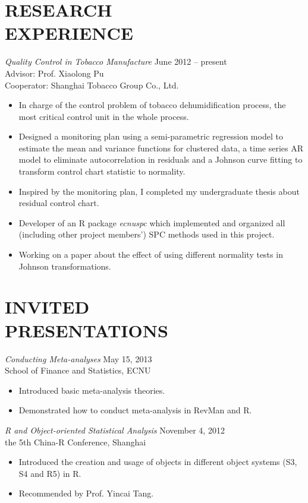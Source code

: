 \documentclass[margin]{res}
\begin{document}
\begin{resume}
		
		\section{RESEARCH \\EXPERIENCE} {\sl Quality Control in Tobacco Manufacture} \hfill June 2012 – present \\
		Advisor: Prof. Xiaolong Pu \\
		Cooperator: Shanghai Tobacco Group Co., Ltd.
		\begin{itemize}  \itemsep -2pt %
			\item In charge of the control problem of tobacco dehumidification process, the most critical control unit in the whole process. 
			\item Designed a monitoring plan using a semi-parametric regression model to estimate the mean and variance functions for clustered data, a time series AR model to eliminate autocorrelation in residuals and a Johnson curve fitting to transform control chart statistic to normality.
			\item Inspired by the monitoring plan, I completed my undergraduate thesis about residual control chart. 
			\item Developer of an R package \emph{ecnuspc} which implemented and organized all (including other project members') SPC methods used in this project.
			\item Working on a paper about the effect of using different normality tests in Johnson transformations. 
		\end{itemize}
		
		
		\section{INVITED \\PRESENTATIONS}
		{\sl Conducting Meta-analyses} \hfill May 15, 2013\\
		School of Finance and Statistics, ECNU
		\begin{itemize}  \itemsep -2pt %
			\item Introduced basic meta-analysis theories.
			\item Demonstrated how to conduct meta-analysis in RevMan and R.
		\end{itemize}
		
		{\sl R and Object-oriented Statistical Analysis} \hfill November 4, 2012\\
		the 5th China-R Conference, Shanghai
		\begin{itemize}  \itemsep -2pt %
			\item Introduced the creation and usage of objects in different object systems (S3, S4 and R5) in R.
			\item Recommended by Prof. Yincai Tang.
		\end{itemize} 
		

\end{resume}
\end{document}

